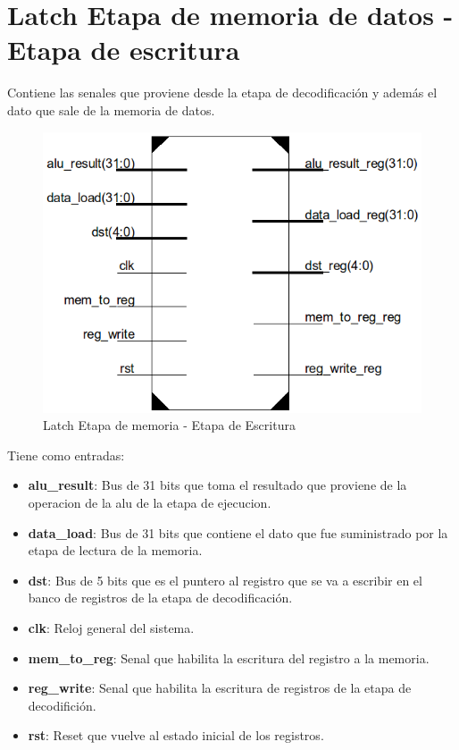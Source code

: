 \section{Latch Etapa de memoria de datos - Etapa de escritura}
Contiene las senales que proviene desde la etapa de decodificaci\'on y adem\'as el dato que sale de la memoria de datos.

\begin{figure}[H]
\centering
\includegraphics[scale=0.5]{img/latch_m_wb}
\caption{Latch Etapa de memoria - Etapa de Escritura}
\label{fig:latch_m_wb}
\end{figure}

Tiene como entradas:
\begin{itemize}
  \item \textbf{alu\_result}: Bus de 31 bits que toma el resultado que proviene de la operacion de la alu de la etapa de ejecucion.
  \item \textbf{data\_load}: Bus de 31 bits que contiene el dato que fue suministrado por la etapa de lectura de la memoria.
  \item \textbf{dst}: Bus de 5 bits que es el puntero al registro que se va a escribir en el banco de registros de la etapa de decodificaci\'on.
  \item \textbf{clk}: Reloj general del sistema.
  \item \textbf{mem\_to\_reg}: Senal que habilita la escritura del registro a la memoria.
  \item \textbf{reg\_write}: Senal que habilita la escritura de registros de la etapa de decodifici\'on.
  \item \textbf{rst}: Reset que vuelve al estado inicial de los registros. 
\end{itemize} 